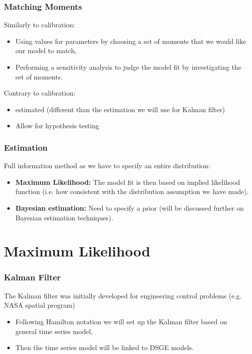 \documentclass[notes=show]{beamer}%
\makeatletter
\let\beamer@writeslidentry@miniframeson=\beamer@writeslidentry
\def\beamer@writeslidentry@miniframesoff{  \expandafter\beamer@ifempty\expandafter{\beamer@framestartpage}{}  {        \clearpage\beamer@notesactions  }
}
\newcommand*{\miniframeson}
{\let\beamer@writeslidentry=\beamer@writeslidentry@miniframeson}
\newcommand*{\miniframesoff}
{\let\beamer@writeslidentry=\beamer@writeslidentry@miniframesoff}
\makeatother
\begin{document}
\begin{frame}

\frametitle{Matching Moments}

Similarly to calibration:
\begin{center}
 \begin{itemize}
\item Using values for parameters by choosing a set of moments that we would like our model to match,
\item Performing a sensitivity analysis to judge the model fit by investigating the set of moments.
\end{itemize}
\end{center}
\bigskip
Contrary to calibration:
\begin{itemize}
\item estimated (different than the estimation we will use for Kalman filter)
\item Allow for hypothesis testing 
\end{itemize}
\end{frame}


\begin{frame}

\frametitle{Estimation}

Full information method as we have to specify an entire distribution:
\begin{center}
 \begin{itemize}
\item \textbf{Maximum Likelihood:} The model fit is then based on implied likelihood function (i.e. how consistent with the distribution assumption we have made).
\item \textbf{Bayesian estimation:}  Need to specify a prior (will be discussed further on Bayesian estimation techniques).
\end{itemize}
\end{center}

\end{frame}


\miniframesoff

\section{Maximum Likelihood}

\miniframeson

\begin{frame}
\frametitle{Kalman Filter}

The Kalman filter was initially developed for engineering control problems (e.g. NASA spatial program)

\begin{center}
 \begin{itemize}
\item Following Hamilton notation we will set up the Kalman filter based on general time series model,
\item Then the time series model will be linked to DSGE models.
\end{itemize}
\end{center}

\end{frame}
\end{document}
